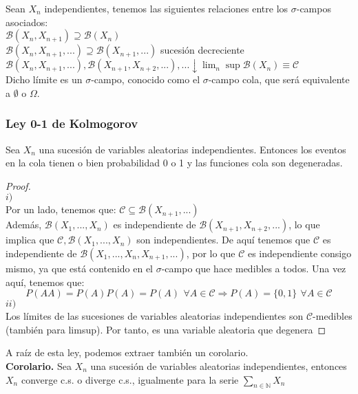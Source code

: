 Sean ${X_n}$ independientes, tenemos las siguientes relaciones entre los $\sigma$-campos asociados:\\

$\mathcal{B}(X_n, X_{n+1}) \supseteq \mathcal{B}(X_n)$\\
$\mathcal{B}(X_n, X_{n+1}, ...) \supseteq \mathcal{B}(X_{n+1}, ...)$ sucesión decreciente\\
$\mathcal{B}(X_n, X_{n+1}, ...), \mathcal{B}(X_{n+1}, X_{n+2}, ...), ... \downarrow \lim_n \sup \mathcal{B}(X_n) \equiv \mathcal{C}$\\

Dicho límite es un $\sigma$-campo, conocido como el $\sigma$-campo cola, que será equivalente a $\emptyset$ o $\Omega$.

\subsubsection{Ley 0-1 de Kolmogorov}
Sea $X_n$ una sucesión de variables aleatorias independientes. Entonces los eventos en la cola tienen o bien probabilidad 0 o 1 y las funciones cola son degeneradas.
\begin{proof}$\,$\\
$i)$\\
Por un lado, tenemos que: $\mathcal{C} \subseteq \mathcal{B}(X_{n+1}, ...)$\\
Además, $\mathcal{B} (X_1, ..., X_n)$ es independiente de $\mathcal{B}(X_{n+1}, X_{n+2},...)$, lo que implica que $\mathcal{C}, \mathcal{B}(X_1,...,X_n)$ son independientes. De aquí tenemos que $\mathcal{C}$ es independiente de $\mathcal{B}(X_1,...,X_n,X_{n+1},...)$, por lo que $\mathcal{C}$ es independiente consigo mismo, ya que está contenido en el $\sigma$-campo que hace medibles a todos. Una vez aquí, tenemos que:
$$ P(AA) = P(A)P(A) = P(A)\, \ \forall A \in \mathcal{C} \Rightarrow P(A) = \{0,1\}\,\ \forall A \in \mathcal{C}$$
$ii)$\\
Los límites de las sucesiones de variables aleatorias independientes son $\mathcal{C}$-medibles (también para limsup). Por tanto, es una variable aleatoria que degenera


\end{proof}

A raíz de esta ley, podemos extraer también un corolario.\\

\textbf{Corolario. }Sea $X_n$ una sucesión de variables aleatorias independientes, entonces $X_n$ converge c.s. o diverge c.s., igualmente para la serie $\sum_{n\in\mathbb{N}} X_n$


